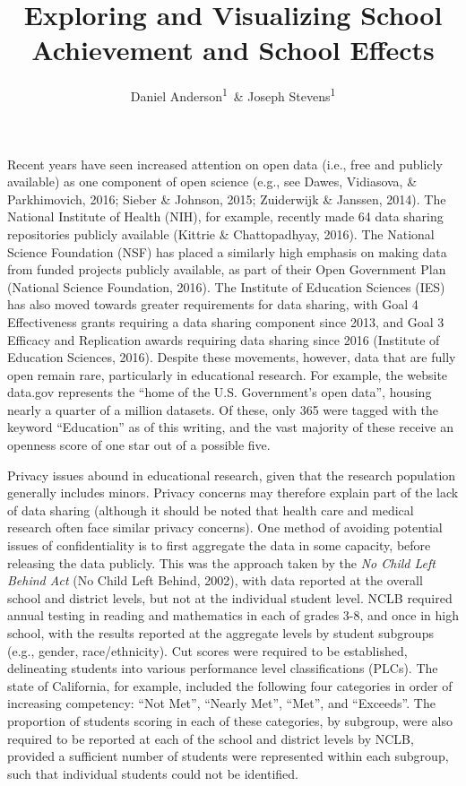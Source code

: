 \documentclass[man, fleqn, noextraspace]{apa6}
\title{Exploring and Visualizing School Achievement and School Effects}
\author{Daniel Anderson\textsuperscript{1}~\& Joseph Stevens\textsuperscript{1}}
\affiliation{
    \vspace{0.5cm}
          \textsuperscript{1} University of Oregon  }
\theoremstyle{definition}
\theoremstyle{definition}
\theoremstyle{definition}
\theoremstyle{remark}
\begin{document}
\maketitle

\setcounter{secnumdepth}{0}



Recent years have seen increased attention on open data (i.e., free and
publicly available) as one component of open science (e.g., see Dawes,
Vidiasova, \& Parkhimovich, 2016; Sieber \& Johnson, 2015; Zuiderwijk \&
Janssen, 2014). The National Institute of Health (NIH), for example,
recently made 64 data sharing repositories publicly available (Kittrie
\& Chattopadhyay, 2016). The National Science Foundation (NSF) has
placed a similarly high emphasis on making data from funded projects
publicly available, as part of their Open Government Plan (National
Science Foundation, 2016). The Institute of Education Sciences (IES) has
also moved towards greater requirements for data sharing, with Goal 4
Effectiveness grants requiring a data sharing component since 2013, and
Goal 3 Efficacy and Replication awards requiring data sharing since 2016
(Institute of Education Sciences, 2016). Despite these movements,
however, data that are fully open remain rare, particularly in
educational research. For example, the website data.gov represents the
\enquote{home of the U.S. Government's open data}, housing nearly a
quarter of a million datasets. Of these, only 365 were tagged with the
keyword \enquote{Education} as of this writing, and the vast majority of
these receive an openness score of one star out of a possible five.

Privacy issues abound in educational research, given that the research
population generally includes minors. Privacy concerns may therefore
explain part of the lack of data sharing (although it should be noted
that health care and medical research often face similar privacy
concerns). One method of avoiding potential issues of confidentiality is
to first aggregate the data in some capacity, before releasing the data
publicly. This was the approach taken by the \emph{No Child Left Behind
Act} (No Child Left Behind, 2002), with data reported at the overall
school and district levels, but not at the individual student level.
NCLB required annual testing in reading and mathematics in each of
grades 3-8, and once in high school, with the results reported at the
aggregate levels by student subgroups (e.g., gender, race/ethnicity).
Cut scores were required to be established, delineating students into
various performance level classifications (PLCs). The state of
California, for example, included the following four categories in order
of increasing competency: \enquote{Not Met}, \enquote{Nearly Met},
\enquote{Met}, and \enquote{Exceeds}. The proportion of students scoring
in each of these categories, by subgroup, were also required to be
reported at each of the school and district levels by NCLB, provided a
sufficient number of students were represented within each subgroup,
such that individual students could not be identified.
\end{document}
